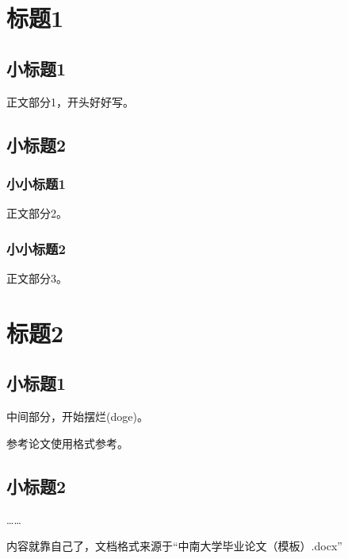 \newpage\vspace*{-21.6pt}

\section{标题1}
\subsection{小标题1}
正文部分1，开头好好写。
\subsection{小标题2}
\subsubsection{小小标题1}
正文部分2。
\subsubsection{小小标题2}
正文部分3。
\newpage
\section{标题2}
\subsection{小标题1}
中间部分，开始摆烂(doge)。

参考论文使用格式参考\cite{IOTJA}。
\subsection{小标题2}
……

内容就靠自己了，文档格式来源于“中南大学毕业论文（模板）.docx”

